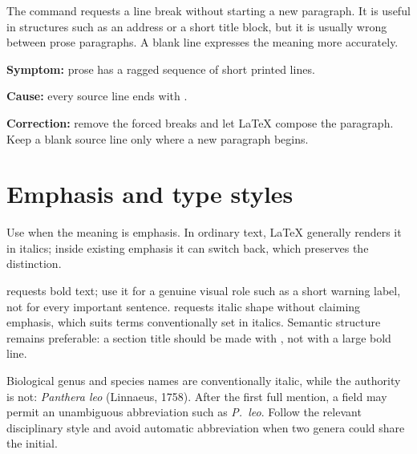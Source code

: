 The command \code{\\} requests a line break without starting a new paragraph.
It is useful in structures such as an address or a short title block, but it is
usually wrong between prose paragraphs. A blank line expresses the meaning
more accurately.

\begin{commonerror}
\textbf{Symptom:} prose has a ragged sequence of short printed lines.

\textbf{Cause:} every source line ends with \code{\\}.

\textbf{Correction:} remove the forced breaks and let \LaTeX{} compose the
paragraph. Keep a blank source line only where a new paragraph begins.
\end{commonerror}

\section{Emphasis and type styles}

Use  when the meaning is emphasis. In ordinary text,
\LaTeX{} generally renders it in italics; inside existing emphasis it can switch
back, which preserves the distinction.


 requests bold text; use it for a genuine visual role such as a
short warning label, not for every important sentence.  requests
italic shape without claiming emphasis, which suits terms conventionally set
in italics. Semantic structure remains preferable: a section title should be
made with , not with a large bold line.

\begin{scienceinpractice}
Biological genus and species names are conventionally italic, while the
authority is not: \textit{Panthera leo} (Linnaeus, 1758). After the first full
mention, a field may permit an unambiguous abbreviation such as
\textit{P.~leo}. Follow the relevant disciplinary style and avoid automatic
abbreviation when two genera could share the initial.
\end{scienceinpractice}


